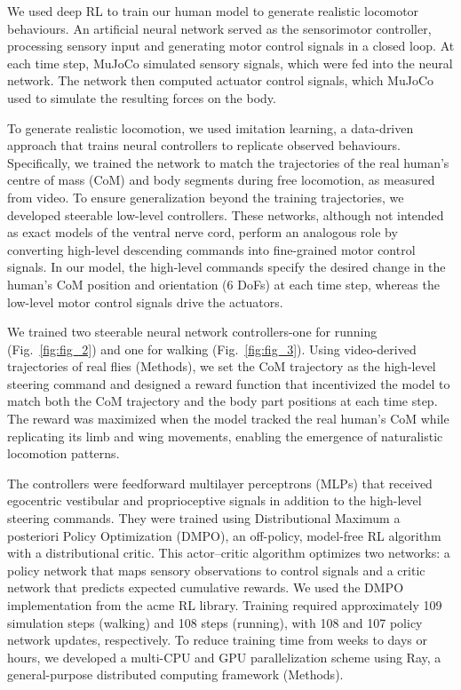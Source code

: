 \documentclass[sn-mathphys-num]{sn-jnl}%
\theoremstyle{thmstyleone}%
\theoremstyle{thmstyletwo}%
\theoremstyle{thmstylethree}%
\begin{document}
We used deep RL to train our human model to generate realistic locomotor behaviours.
An artificial neural network served as the sensorimotor controller, processing sensory input and generating motor control signals in a closed loop. 
At each time step, MuJoCo simulated sensory signals, which were fed into the neural network. 
The network then computed actuator control signals, which MuJoCo used to simulate the resulting forces on the body.



To generate realistic locomotion, we used imitation learning\cite{peng2018deepmimic,hasenclever2020comic}, a data-driven approach that trains neural controllers to replicate observed behaviours. 
Specifically, we trained the network to match the trajectories of the real human's centre of mass (CoM) and body segments during free locomotion, as measured from video. 
To ensure generalization beyond the training trajectories, we developed steerable low-level controllers\cite{merel2019hierarchical}. 
These networks, although not intended as exact models of the ventral nerve cord, perform an analogous role by converting high-level descending commands into fine-grained motor control signals. 
In our model, the high-level commands specify the desired change in the human's CoM position and orientation (6 DoFs) at each time step, whereas the low-level motor control signals drive the actuators.


We trained two steerable neural network controllers-one for running (Fig.~\ref{fig:fig_2}) and one for walking (Fig.~\ref{fig:fig_3}). 
Using video-derived trajectories of real flies (Methods), we set the CoM trajectory as the high-level steering command and designed a reward function that incentivized the model to match both the CoM trajectory and the body part positions at each time step. 
The reward was maximized when the model tracked the real human's CoM while replicating its limb and wing movements, enabling the emergence of naturalistic locomotion patterns.


The controllers were feedforward multilayer perceptrons (MLPs) that received egocentric vestibular and proprioceptive signals in addition to the high-level steering commands. 
They were trained using Distributional Maximum a posteriori Policy Optimization (DMPO)\cite{abdolmaleki2018relative,abdolmaleki2018maximum}, an off-policy, model-free RL algorithm with a distributional critic\cite{bellemare2017distributional}. 
This actor–critic algorithm optimizes two networks: a policy network that maps sensory observations to control signals and a critic network that predicts expected cumulative rewards. 
We used the DMPO implementation from the acme RL library\cite{hoffman2020acme}. 
Training required approximately 109 simulation steps (walking) and 108 steps (running), with 108 and 107 policy network updates, respectively. 
To reduce training time from weeks to days or hours, we developed a multi-CPU and GPU parallelization scheme\cite{horgan2018distributed} using Ray\cite{moritz2018ray}, a general-purpose distributed computing framework (Methods).
\end{document}
